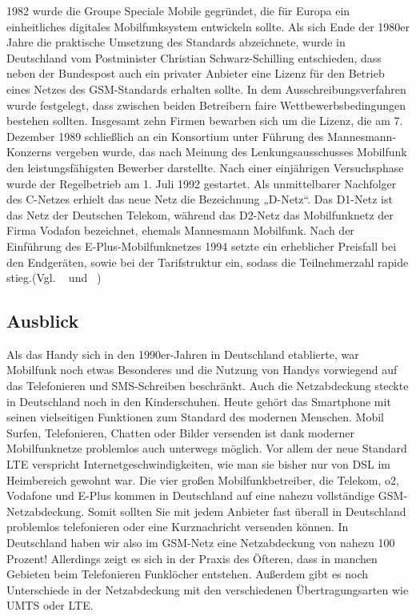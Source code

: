 \begin{multicols}{3}

1982 wurde die Groupe Speciale Mobile gegründet, die für Europa ein einheitliches digitales Mobilfunksystem entwickeln sollte. Als sich Ende der 1980er Jahre die praktische Umsetzung des Standards abzeichnete, wurde in Deutschland vom Postminister Christian Schwarz-Schilling entschieden, dass neben der Bundespost auch ein privater Anbieter eine Lizenz für den Betrieb eines Netzes des GSM-Standards erhalten sollte. In dem Ausschreibungsverfahren wurde festgelegt, dass zwischen beiden Betreibern faire Wettbewerbsbedingungen bestehen sollten. Insgesamt zehn Firmen bewarben sich um die Lizenz, die am 7. Dezember 1989 schließlich an ein Konsortium unter Führung des Mannesmann-Konzerns vergeben wurde, das nach Meinung des Lenkungsausschusses Mobilfunk den leistungsfähigsten Bewerber darstellte.
Nach einer einjährigen Versuchsphase wurde der Regelbetrieb am 1. Juli 1992 gestartet. Als unmittelbarer Nachfolger des C-Netzes erhielt das neue Netz die Bezeichnung „D-Netz“.
Das D1-Netz ist das Netz der Deutschen Telekom, während das D2-Netz das Mobilfunknetz der Firma Vodafon bezeichnet, ehemals Mannesmann Mobilfunk. Nach der Einführung des E-Plus-Mobilfunknetzes 1994 setzte ein erheblicher Preisfall bei den Endgeräten, sowie bei der Tarifstruktur ein, sodass die Teilnehmerzahl rapide stieg.(Vgl. ~\cite{DNetz.3} und ~\cite{DNetz.4})

\subsection*{Ausblick}

Als das Handy sich in den 1990er-Jahren in Deutschland etablierte, war Mobilfunk noch etwas Besonderes und die Nutzung von Handys vorwiegend auf das Telefonieren und SMS-Schreiben beschränkt. Auch die Netzabdeckung steckte in Deutschland noch in den Kinderschuhen. Heute gehört das Smartphone mit seinen vielseitigen Funktionen zum Standard des modernen Menschen. Mobil Surfen, Telefonieren, Chatten oder Bilder versenden ist dank moderner Mobilfunknetze problemlos auch unterwegs möglich. Vor allem der neue Standard LTE verspricht Internetgeschwindigkeiten, wie man sie bisher nur von DSL im Heimbereich gewohnt war.
Die vier großen Mobilfunkbetreiber, die Telekom, o2, Vodafone und E-Plus kommen in Deutschland auf eine nahezu vollständige GSM-Netzabdeckung. Somit sollten Sie mit jedem Anbieter fast überall in Deutschland problemlos telefonieren oder eine Kurznachricht versenden können. In Deutschland haben wir also im GSM-Netz eine Netzabdeckung von nahezu 100 Prozent! Allerdings zeigt es sich in der Praxis des Öfteren, dass in manchen Gebieten beim Telefonieren Funklöcher entstehen. Außerdem gibt es noch Unterschiede in der Netzabdeckung mit den verschiedenen Übertragungsarten wie UMTS oder LTE.


\end{multicols}
